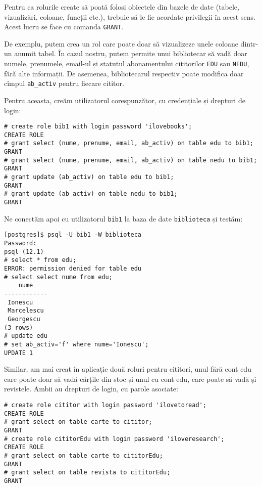 Pentru ca rolurile create să poată folosi obiectele din bazele de date
(tabele, vizualizări, coloane, funcții etc.), trebuie să le fie acordate
privilegii în acest sens. Acest lucru se face cu comanda \texttt{GRANT}.

De exemplu, putem crea un rol care poate doar să vizualizeze unele
coloane dintr-un anumit tabel. În cazul nostru, putem permite unui
bibliotecar să vadă doar numele, prenumele, email-ul și statutul abonamentului
cititorilor \texttt{EDU} sau \texttt{NEDU}, fără alte informații. De asemenea,
bibliotecarul respectiv poate modifica doar cîmpul \texttt{ab\_activ} pentru
fiecare cititor.

Pentru aceasta, creăm utilizatorul corespunzător, cu credențiale și
drepturi de login:
{
  \small
\begin{verbatim}
# create role bib1 with login password 'ilovebooks';
CREATE ROLE
# grant select (nume, prenume, email, ab_activ) on table edu to bib1;
GRANT
# grant select (nume, prenume, email, ab_activ) on table nedu to bib1;
GRANT
# grant update (ab_activ) on table edu to bib1;
GRANT
# grant update (ab_activ) on table nedu to bib1;
GRANT
\end{verbatim}
}

Ne conectăm apoi cu utilizatorul \texttt{bib1} la baza de date \texttt{biblioteca}
și testăm:
{
  \small
\begin{verbatim}
[postgres]$ psql -U bib1 -W biblioteca
Password:
psql (12.1)
# select * from edu;
ERROR: permission denied for table edu
# select select nume from edu;
    nume    
------------
 Ionescu
 Marcelescu
 Georgescu
(3 rows)
# update edu
# set ab_activ='f' where nume='Ionescu';
UPDATE 1
\end{verbatim}
}

Similar, am mai creat în aplicație două roluri pentru cititori, unul fără cont
edu care poate doar să vadă cărțile din stoc și unul cu cont edu, care poate să
vadă și revistele. Ambii au drepturi de login, cu parole asociate:

{
  \small
\begin{verbatim}
# create role cititor with login password 'ilovetoread';
CREATE ROLE
# grant select on table carte to cititor;
GRANT
# create role cititorEdu with login password 'iloveresearch';
CREATE ROLE
# grant select on table carte to cititorEdu;
GRANT
# grant select on table revista to cititorEdu;
GRANT
\end{verbatim}
}

